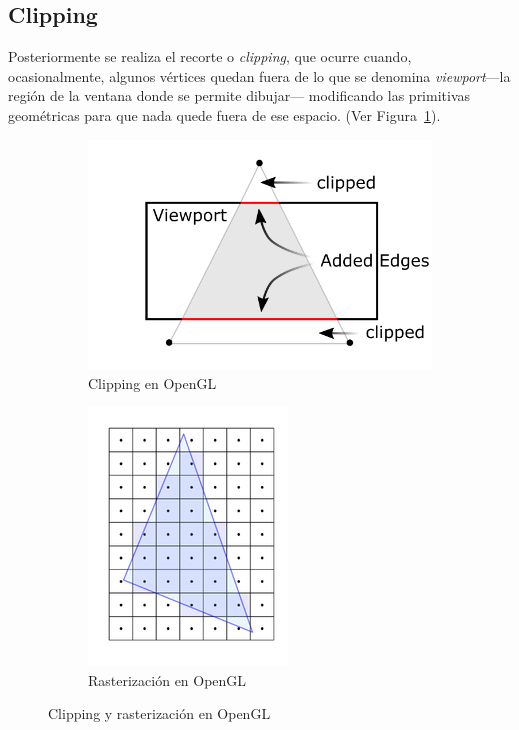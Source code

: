 \subsection{Clipping}
\label{ref:clipping}

Posteriormente se realiza el recorte o \textit{clipping}, que ocurre cuando,
ocasionalmente, algunos vértices quedan fuera de lo que se denomina
\textit{viewport}---la región de la ventana donde se permite dibujar---
modificando las primitivas geométricas para que nada quede fuera de ese espacio.
(Ver Figura~\ref{fig2.3a}).

\begin{figure}[h]
	\begin{subfigure}[b]{0.5\textwidth}
		\centering 
		\includegraphics{figures/clipping.png}
		\caption{Clipping en OpenGL}
		\label{fig2.3a}
	\end{subfigure}
	\begin{subfigure}[b]{0.5\textwidth}
		\centering 
		\includegraphics{figures/rasterization.png}
		\caption{Rasterización en OpenGL}
		\label{fig2.3b}
	\end{subfigure}
	\caption{Clipping y rasterización en OpenGL}
	\label{fig2.3}
\end{figure}

